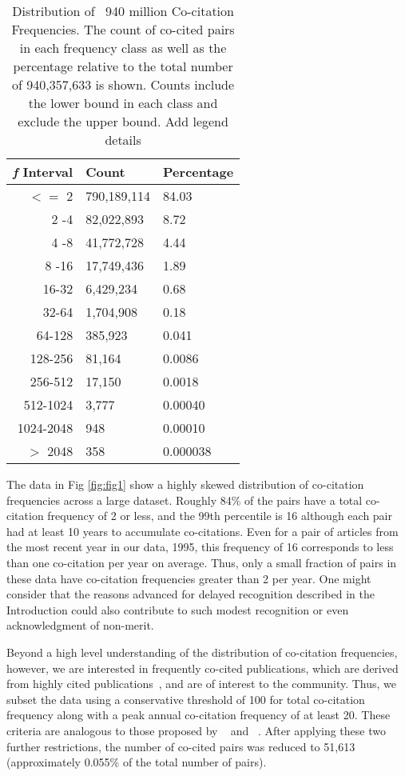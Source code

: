 \documentclass[utf8]{frontiersSCNS}
\newcommand\Tstrut{\rule{0pt}{2.9ex}} %
\begin{document}
\begin{table}[ht]
\caption{Distribution of ~940 million Co-citation Frequencies. The count of co-cited pairs in each frequency class as well as the percentage relative to the total number of 940,357,633 is shown. Counts include the lower bound in each class and exclude the upper bound. Add legend details}%
\centering %
\begin{center}
\begin{tabular}{rll} 
\emph{f} Interval & Count & Percentage \\
\hline %
$<=$ 2 & 790,189,114 & 84.03 \Tstrut\\ 
2 -4 & 82,022,893 & 8.72 \\
4 -8 & 41,772,728 & 4.44 \\
8 -16 & 17,749,436 & 1.89 \\
16-32 & 6,429,234 & 0.68\\
32-64 & 1,704,908 & 0.18\\
64-128 & 385,923 & 0.041\\
128-256 & 81,164 & 0.0086\\ 
256-512 & 17,150 & 0.0018\\
512-1024 & 3,777 & 0.00040\\
1024-2048 & 948 & 0.00010\\ 
$> $ 2048 & 358 & 0.000038\\   
\hline 
\end{tabular}
\end{center}
\label{tab:table1} %
\end{table}


The data in Fig \ref{fig:fig1} show a highly skewed distribution of co-citation frequencies across a large dataset. Roughly 84\% of the pairs have a total co-citation frequency of 2 or less, and the 99th percentile is 16 although each pair had at least 10 years to accumulate co-citations. Even for a pair of articles from the most recent year in our data, 1995, this frequency of 16 corresponds to less than one co-citation per year on average. Thus, only a small fraction of pairs in these data have co-citation frequencies greater than 2 per year. One might consider that the reasons advanced for delayed recognition described in the Introduction could also contribute to such modest recognition or even acknowledgment of non-merit.

Beyond a high level understanding of the distribution of co-citation frequencies, however, we are interested in frequently co-cited publications, which are derived from highly cited publications~\citep{Small1973}, and 
are of interest to the community.  Thus, we subset the data using a conservative threshold of 100 for total co-citation frequency along with a peak annual co-citation frequency of at least 20. These criteria are analogous to those proposed by ~\cite{Raan2004} and ~\cite{redner_2005}. After applying these two further restrictions, the number of co-cited pairs was reduced to 51,613 (approximately 0.055\% of the total number of pairs).
\end{document}

